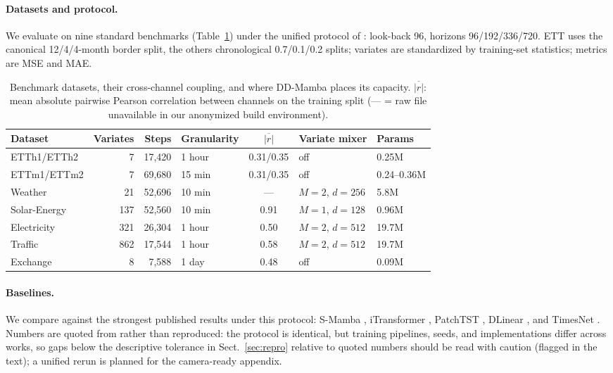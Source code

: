 \documentclass[runningheads]{llncs}
\newcommand{\model}{DD-Mamba}
\begin{document}
\paragraph{Datasets and protocol.} We evaluate on nine standard benchmarks
(Table~\ref{tab:datasets}) under the unified protocol of
\cite{itransformer,smamba}: look-back 96, horizons 96/192/336/720. ETT
uses the canonical 12/4/4-month border split, the others chronological
0.7/0.1/0.2 splits; variates are standardized by training-set statistics;
metrics are MSE and MAE.

\begin{table}[tb]
\centering
\caption{Benchmark datasets, their cross-channel coupling, and where
\model{} places its capacity. $\overline{|r|}$: mean absolute pairwise
Pearson correlation between channels on the training split (--- = raw file
unavailable in our anonymized build environment).}
\label{tab:datasets}
\begin{tabular}{@{}lrrlcll@{}}
\toprule
Dataset & Variates & Steps & Granularity & $\overline{|r|}$ & Variate mixer & Params \\
\midrule
ETTh1/ETTh2 & 7 & 17{,}420 & 1 hour & 0.31/0.35 & off & 0.25M \\
ETTm1/ETTm2 & 7 & 69{,}680 & 15 min & 0.31/0.35 & off & 0.24--0.36M \\
Weather & 21 & 52{,}696 & 10 min & --- & $M{=}2$, $d{=}256$ & 5.8M \\
Solar-Energy & 137 & 52{,}560 & 10 min & 0.91 & $M{=}1$, $d{=}128$ & 0.96M \\
Electricity & 321 & 26{,}304 & 1 hour & 0.50 & $M{=}2$, $d{=}512$ & 19.7M \\
Traffic & 862 & 17{,}544 & 1 hour & 0.58 & $M{=}2$, $d{=}512$ & 19.7M \\
Exchange & 8 & 7{,}588 & 1 day & 0.48 & off & 0.09M \\
\bottomrule
\end{tabular}
\end{table}

\paragraph{Baselines.} We compare against the strongest published results
under this protocol: S-Mamba \cite{smamba}, iTransformer \cite{itransformer},
PatchTST \cite{patchtst}, DLinear \cite{dlinear}, and TimesNet
\cite{timesnet}. Numbers are quoted from \cite{smamba} rather than
reproduced: the protocol is identical, but training pipelines, seeds, and
implementations differ across works, so gaps below the descriptive tolerance in
Sect.~\ref{sec:repro} relative to quoted
numbers should be read with caution (flagged in the text); a unified rerun
is planned for the camera-ready appendix.
\end{document}
